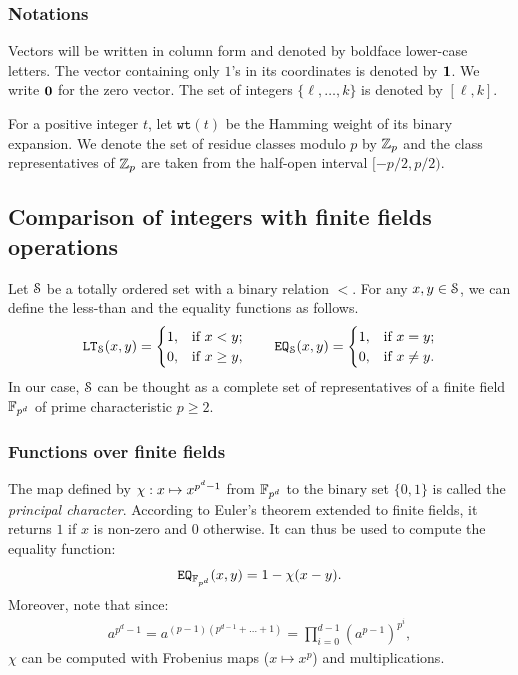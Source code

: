 \subsubsection{Notations}
Vectors will be written in column form and denoted by boldface lower-case letters. The vector containing only $1$'s in its coordinates is denoted by $\1$. We write $\0$ for the zero vector. The set of integers $\{\ell,\dots,k\}$ is denoted by $[\ell,k]$.

For a positive integer $t$, let $\texttt{wt}(t)$ be the Hamming weight of its binary expansion. We denote the set of residue classes modulo $p$ by $\Z_p$ and the class representatives of $\Z_p$ are taken from the half-open interval $[-p/2, p/2)$.

\subsection{Comparison of integers with finite fields operations}
Let $\S$ be a totally ordered set with a binary relation $<$.
For any $x,y \in \S$, we can define the less-than and the equality functions as follows.
\begin{align*}
  \LT_\S(x,y) = 
  \begin{cases}
    1, & \text{if } x < y; \\
    0, & \text{if } x \ge y, \\
  \end{cases}
  \qquad
  \EQ_\S(x,y) = 
  \begin{cases}
    1, & \text{if } x = y; \\
    0, & \text{if } x \neq y. \\
  \end{cases}
\end{align*}
In our case, $\S$ can be thought as a complete set of representatives of a finite field $\F_{p^d}$ of prime characteristic $p\geq 2$.

\subsubsection{Functions over finite fields}\label{subsec:funcff}
The map defined by $\princhar: x \mapsto x^{p^d-1}$ from $\F_{p^d}$ to the binary set $\{0,1\}$ is called the \emph{principal character}. According to Euler's theorem extended to finite fields, it returns $1$ if $x$ is non-zero and $0$ otherwise. It can thus be used to compute the equality function:
\begin{align*}
  \EQ_{\F_{p^d}}(x,y) = 1 - \princhar (x-y).
\end{align*}
Moreover, note that since:
\begin{align}\label{eq:exp_frob}
  a^{p^d-1} = a^{(p-1)(p^{d-1} + \dots + 1)} = \prod_{i=0}^{d-1} (a^{p-1})^{p^i},
\end{align}
$\chi$ can be computed with Frobenius maps ($x \mapsto x^p$) and multiplications.


